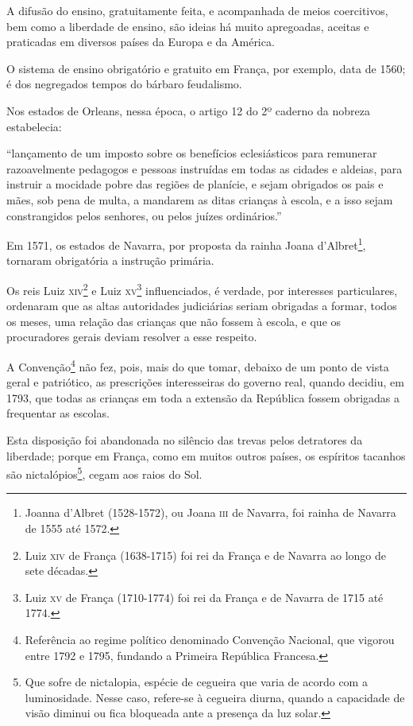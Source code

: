 A difusão do ensino, gratuitamente feita, e acompanhada de meios
coercitivos, bem como a liberdade de ensino, são ideias há muito
apregoadas, aceitas e praticadas em diversos países da Europa e da
América.

O sistema de ensino obrigatório e gratuito em França, por exemplo, data
de 1560; é dos negregados tempos do bárbaro feudalismo.

Nos estados de Orleans, nessa época, o artigo 12 do 2º caderno da
nobreza estabelecia:

``lançamento de um imposto sobre os benefícios eclesiásticos para
remunerar razoavelmente pedagogos e pessoas instruídas em todas as
cidades e aldeias, para instruir a mocidade pobre das regiões de
planície, e sejam obrigados os pais e mães, sob pena de multa, a
mandarem as ditas crianças à escola, e a isso sejam constrangidos pelos
senhores, ou pelos juízes ordinários.''

Em 1571, os estados de Navarra, por proposta da rainha Joana
d'Albret\footnote{Joanna d'Albret (1528-1572), ou Joana \textsc{iii} de
  Navarra, foi rainha de Navarra de 1555 até 1572.}, tornaram
obrigatória a instrução primária.

Os reis Luiz \textsc{xiv}\footnote{Luiz \textsc{xiv} de França (1638-1715) foi rei da
  França e de Navarra ao longo de sete décadas.} e Luiz \textsc{xv}\footnote{
  Luiz \textsc{xv} de França (1710-1774) foi rei da França e de Navarra de 1715
  até 1774.} influenciados, é verdade, por interesses particulares,
ordenaram que as altas autoridades judiciárias seriam obrigadas a
formar, todos os meses, uma relação das crianças que não fossem à
escola, e que os procuradores gerais deviam resolver a esse respeito.

A Convenção\footnote{Referência ao regime político denominado
  Convenção Nacional, que vigorou entre 1792 e 1795, fundando a Primeira
  República Francesa.} não fez, pois, mais do que tomar, debaixo de um
ponto de vista geral e patriótico, as prescrições interesseiras do
governo real, quando decidiu, em 1793, que todas as crianças em toda a
extensão da República fossem obrigadas a frequentar as escolas.

Esta disposição foi abandonada no silêncio das trevas pelos detratores
da liberdade; porque em França, como em muitos outros países, os
espíritos tacanhos são nictalópios\footnote{Que sofre de nictalopia,
  espécie de cegueira que varia de acordo com a luminosidade. Nesse
  caso, refere-se à cegueira diurna, quando a capacidade de visão
  diminui ou fica bloqueada ante a presença da luz solar.}, cegam aos
raios do Sol.

